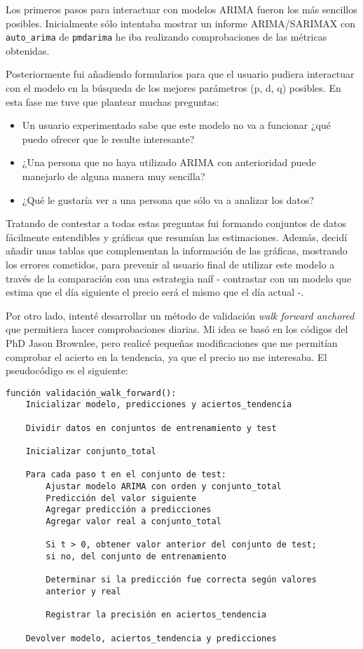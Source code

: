 Los primeros pasos para interactuar con modelos ARIMA fueron los más sencillos posibles. Inicialmente sólo intentaba mostrar un informe ARIMA/SARIMAX con \texttt{auto\_arima} de \texttt{pmdarima} he iba realizando comprobaciones de las métricas obtenidas. 

Posteriormente fui añadiendo formularios para que el usuario pudiera interactuar con el modelo en la búsqueda de los mejores parámetros (p, d, q) posibles. En esta fase me tuve que plantear muchas preguntas:

\begin{itemize}
\item
Un usuario experimentado sabe que este modelo no va a funcionar ¿qué puedo ofrecer que le resulte interesante?
\item
¿Una persona que no haya utilizado ARIMA con anterioridad puede manejarlo de alguna manera muy sencilla?
\item
¿Qué le gustaría ver a una persona que sólo va a analizar los datos?
\end{itemize}

Tratando de contestar a todas estas preguntas fui formando conjuntos de datos fácilmente entendibles y gráficas que resumían las estimaciones. Además, decidí añadir unas tablas que complementan la información de las gráficas, mostrando los errores cometidos, para prevenir al usuario final de utilizar este modelo a través de la comparación con una estrategia naíf - contrastar con un modelo que estima que el día siguiente el precio será el mismo que el día actual -.

Por otro lado, intenté desarrollar un método de validación \emph{walk forward anchored} que permitiera hacer comprobaciones diarias. Mi idea se basó en los códigos del PhD Jason Brownlee\citep{online:walk_forward_code}, pero realicé pequeñas modificaciones que me permitían comprobar el acierto en la tendencia, ya que el precio no me interesaba. El pseudocódigo es el siguiente:

\begin{verbatim}
función validación_walk_forward():
    Inicializar modelo, predicciones y aciertos_tendencia

    Dividir datos en conjuntos de entrenamiento y test

    Inicializar conjunto_total

    Para cada paso t en el conjunto de test:
        Ajustar modelo ARIMA con orden y conjunto_total
        Predicción del valor siguiente
        Agregar predicción a predicciones
        Agregar valor real a conjunto_total

        Si t > 0, obtener valor anterior del conjunto de test; 
        si no, del conjunto de entrenamiento
        
        Determinar si la predicción fue correcta según valores
        anterior y real
        
        Registrar la precisión en aciertos_tendencia

    Devolver modelo, aciertos_tendencia y predicciones
\end{verbatim}

